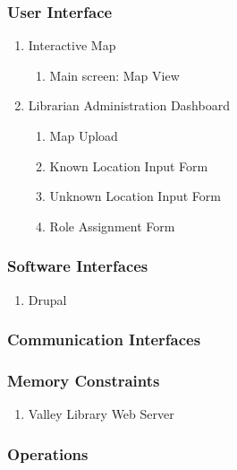 \documentclass[letterpaper,10pt,titlepage]{article}
\begin{document}
\subsubsection{User Interface}
\begin{enumerate}
	\item Interactive Map
    \begin{enumerate}
    	\item Main screen: Map View
    \end{enumerate}
	\item Librarian Administration Dashboard
    \begin{enumerate}
    	\item Map Upload
        \item Known Location Input Form
        \item Unknown Location Input Form
        \item Role Assignment Form
    \end{enumerate}
\end{enumerate}

\subsubsection{Software Interfaces}
\begin{enumerate}
	\item Drupal
\end{enumerate}

\subsubsection{Communication Interfaces}

\subsubsection{Memory Constraints}
\begin{enumerate}
	\item Valley Library Web Server
\end{enumerate}

\subsubsection{Operations}
\end{document}
